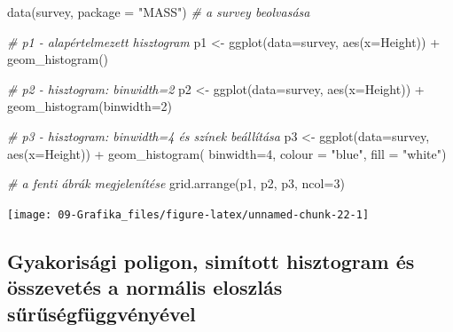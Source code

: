 \documentclass[
]{book}
\newenvironment{Shaded}{\begin{snugshade}}{\end{snugshade}}
\newcommand{\AttributeTok}[1]{\textcolor[rgb]{0.77,0.63,0.00}{#1}}
\newcommand{\CommentTok}[1]{\textcolor[rgb]{0.56,0.35,0.01}{\textit{#1}}}
\newcommand{\DecValTok}[1]{\textcolor[rgb]{0.00,0.00,0.81}{#1}}
\newcommand{\FunctionTok}[1]{\textcolor[rgb]{0.00,0.00,0.00}{#1}}
\newcommand{\NormalTok}[1]{#1}
\newcommand{\OtherTok}[1]{\textcolor[rgb]{0.56,0.35,0.01}{#1}}
\newcommand{\SpecialCharTok}[1]{\textcolor[rgb]{0.00,0.00,0.00}{#1}}
\newcommand{\StringTok}[1]{\textcolor[rgb]{0.31,0.60,0.02}{#1}}
\begin{document}
\begin{Shaded}
\begin{Highlighting}[]
\FunctionTok{data}\NormalTok{(survey, }\AttributeTok{package =} \StringTok{"MASS"}\NormalTok{) }\CommentTok{\# a survey beolvasása}

\CommentTok{\# p1 {-} alapértelmezett hisztogram }
\NormalTok{p1 }\OtherTok{\textless{}{-}} \FunctionTok{ggplot}\NormalTok{(}\AttributeTok{data=}\NormalTok{survey, }\FunctionTok{aes}\NormalTok{(}\AttributeTok{x=}\NormalTok{Height)) }\SpecialCharTok{+} \FunctionTok{geom\_histogram}\NormalTok{()}

\CommentTok{\# p2 {-} hisztogram: binwidth=2}
\NormalTok{p2 }\OtherTok{\textless{}{-}} \FunctionTok{ggplot}\NormalTok{(}\AttributeTok{data=}\NormalTok{survey, }\FunctionTok{aes}\NormalTok{(}\AttributeTok{x=}\NormalTok{Height)) }\SpecialCharTok{+} \FunctionTok{geom\_histogram}\NormalTok{(}\AttributeTok{binwidth=}\DecValTok{2}\NormalTok{)}

\CommentTok{\# p3 {-} hisztogram: binwidth=4 és színek beállítása}
\NormalTok{p3 }\OtherTok{\textless{}{-}} \FunctionTok{ggplot}\NormalTok{(}\AttributeTok{data=}\NormalTok{survey, }\FunctionTok{aes}\NormalTok{(}\AttributeTok{x=}\NormalTok{Height)) }\SpecialCharTok{+} 
        \FunctionTok{geom\_histogram}\NormalTok{( }\AttributeTok{binwidth=}\DecValTok{4}\NormalTok{, }\AttributeTok{colour =} \StringTok{"blue"}\NormalTok{, }\AttributeTok{fill =} \StringTok{"white"}\NormalTok{)}

\CommentTok{\# a fenti ábrák megjelenítése}
\FunctionTok{grid.arrange}\NormalTok{(p1, p2, p3, }\AttributeTok{ncol=}\DecValTok{3}\NormalTok{)}
\end{Highlighting}
\end{Shaded}

\begin{center}\texttt{[image: 09-Grafika\_files/figure-latex/unnamed-chunk-22-1]} \end{center}

\hypertarget{gyakorisuxe1gi-poligon-simuxedtott-hisztogram-uxe9s-uxf6sszevetuxe9s-a-normuxe1lis-eloszluxe1s-sux171rux171suxe9gfuxfcggvuxe9nyuxe9vel}{%
\subsection{Gyakorisági poligon, simított hisztogram és összevetés a normális eloszlás sűrűségfüggvényével}\label{gyakorisuxe1gi-poligon-simuxedtott-hisztogram-uxe9s-uxf6sszevetuxe9s-a-normuxe1lis-eloszluxe1s-sux171rux171suxe9gfuxfcggvuxe9nyuxe9vel}}
\end{document}
